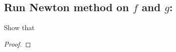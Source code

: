 \documentclass[11pt,a4paper]{article}
\begin{document}
\subsection{Run Newton method on $f$ and $g$: }
Show that 
\begin{proof}

\end{proof}

\end{document}
